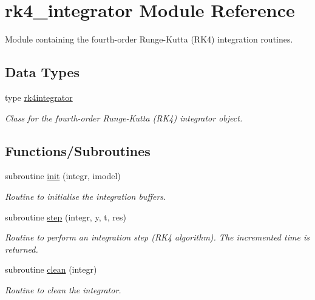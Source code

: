 \hypertarget{namespacerk4__integrator}{}\section{rk4\+\_\+integrator Module Reference}
\label{namespacerk4__integrator}


Module containing the fourth-\/order Runge-\/\+Kutta (R\+K4) integration routines.  


\subsection*{Data Types}
\begin{DoxyCompactItemize}
\item 
type \hyperlink{structrk4__integrator_1_1rk4integrator}{rk4integrator}
\begin{DoxyCompactList}\small\item\em Class for the fourth-\/order Runge-\/\+Kutta (R\+K4) integrator object. \end{DoxyCompactList}\end{DoxyCompactItemize}
\subsection*{Functions/\+Subroutines}
\begin{DoxyCompactItemize}
\item 
subroutine \hyperlink{namespacerk4__integrator_a28281cb923e5a74dcbc518a1ea2269b1}{init} (integr, imodel)
\begin{DoxyCompactList}\small\item\em Routine to initialise the integration buffers. \end{DoxyCompactList}\item 
subroutine \hyperlink{namespacerk4__integrator_affbb7f244c8be3f9493b8a7876d3753b}{step} (integr, y, t, res)
\begin{DoxyCompactList}\small\item\em Routine to perform an integration step (R\+K4 algorithm). The incremented time is returned. \end{DoxyCompactList}\item 
subroutine \hyperlink{namespacerk4__integrator_a4883cf93b6d3ba274296d2d255059473}{clean} (integr)
\begin{DoxyCompactList}\small\item\em Routine to clean the integrator. \end{DoxyCompactList}\end{DoxyCompactItemize}



